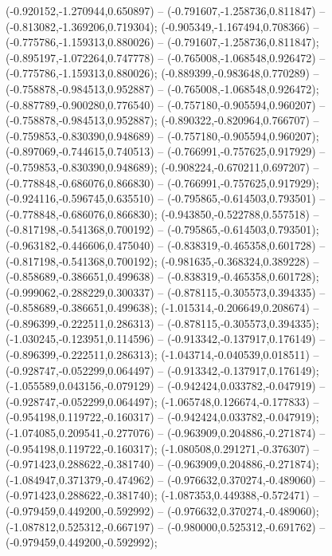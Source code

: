  (-0.920152,-1.270944,0.650897) -- (-0.791607,-1.258736,0.811847) -- (-0.813082,-1.369206,0.719304);
 (-0.905349,-1.167494,0.708366) -- (-0.775786,-1.159313,0.880026) -- (-0.791607,-1.258736,0.811847);
 (-0.895197,-1.072264,0.747778) -- (-0.765008,-1.068548,0.926472) -- (-0.775786,-1.159313,0.880026);
 (-0.889399,-0.983648,0.770289) -- (-0.758878,-0.984513,0.952887) -- (-0.765008,-1.068548,0.926472);
 (-0.887789,-0.900280,0.776540) -- (-0.757180,-0.905594,0.960207) -- (-0.758878,-0.984513,0.952887);
 (-0.890322,-0.820964,0.766707) -- (-0.759853,-0.830390,0.948689) -- (-0.757180,-0.905594,0.960207);
 (-0.897069,-0.744615,0.740513) -- (-0.766991,-0.757625,0.917929) -- (-0.759853,-0.830390,0.948689);
 (-0.908224,-0.670211,0.697207) -- (-0.778848,-0.686076,0.866830) -- (-0.766991,-0.757625,0.917929);
 (-0.924116,-0.596745,0.635510) -- (-0.795865,-0.614503,0.793501) -- (-0.778848,-0.686076,0.866830);
 (-0.943850,-0.522788,0.557518) -- (-0.817198,-0.541368,0.700192) -- (-0.795865,-0.614503,0.793501);
 (-0.963182,-0.446606,0.475040) -- (-0.838319,-0.465358,0.601728) -- (-0.817198,-0.541368,0.700192);
 (-0.981635,-0.368324,0.389228) -- (-0.858689,-0.386651,0.499638) -- (-0.838319,-0.465358,0.601728);
 (-0.999062,-0.288229,0.300337) -- (-0.878115,-0.305573,0.394335) -- (-0.858689,-0.386651,0.499638);
 (-1.015314,-0.206649,0.208674) -- (-0.896399,-0.222511,0.286313) -- (-0.878115,-0.305573,0.394335);
 (-1.030245,-0.123951,0.114596) -- (-0.913342,-0.137917,0.176149) -- (-0.896399,-0.222511,0.286313);
 (-1.043714,-0.040539,0.018511) -- (-0.928747,-0.052299,0.064497) -- (-0.913342,-0.137917,0.176149);
 (-1.055589,0.043156,-0.079129) -- (-0.942424,0.033782,-0.047919) -- (-0.928747,-0.052299,0.064497);
 (-1.065748,0.126674,-0.177833) -- (-0.954198,0.119722,-0.160317) -- (-0.942424,0.033782,-0.047919);
 (-1.074085,0.209541,-0.277076) -- (-0.963909,0.204886,-0.271874) -- (-0.954198,0.119722,-0.160317);
 (-1.080508,0.291271,-0.376307) -- (-0.971423,0.288622,-0.381740) -- (-0.963909,0.204886,-0.271874);
 (-1.084947,0.371379,-0.474962) -- (-0.976632,0.370274,-0.489060) -- (-0.971423,0.288622,-0.381740);
 (-1.087353,0.449388,-0.572471) -- (-0.979459,0.449200,-0.592992) -- (-0.976632,0.370274,-0.489060);
 (-1.087812,0.525312,-0.667197) -- (-0.980000,0.525312,-0.691762) -- (-0.979459,0.449200,-0.592992);
